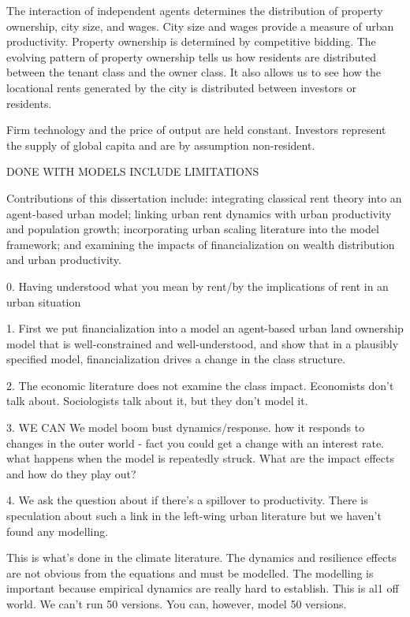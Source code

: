 The interaction of independent agents determines the distribution of property ownership,  city size, and wages. City size and wages provide a measure of urban productivity. Property ownership is determined by competitive bidding. The evolving pattern of property ownership tells us how residents are distributed between the tenant class and the owner class. It also allows us to see how the locational rents generated by the city is distributed between investors or residents.  %

Firm technology and the price of output are held constant. Investors represent the supply of global capita and are by assumption non-resident.   %




DONE WITH MODELS INCLUDE LIMITATIONS

Contributions of this dissertation include: integrating classical rent theory into an agent-based urban model; linking urban rent dynamics with urban productivity and population growth; incorporating urban scaling literature into the model framework; and examining the impacts of financialization on wealth distribution and urban productivity.



0. Having understood what you mean by rent/by the implications of rent in an urban situation

1. First we put financialization into a model an agent-based urban land ownership model that is well-constrained and well-understood, and show that in a plausibly specified model, financialization drives a change in the class structure. 

2. The economic literature does not examine the class impact. Economists don't talk about. Sociologists talk about it, but they don't model it.

3. WE CAN We model boom bust dynamics/response. how it responds to changes in the outer world - fact you could get a change with an interest rate. what happens when the model is repeatedly struck. What are the impact effects and how do they play out?

4.  We ask the question about if there's a spillover to productivity. There is speculation about such a link in the left-wing urban literature but we haven't found any modelling.

This is what's done in the climate literature. The dynamics and resilience effects are not obvious from the equations and must be modelled. The modelling is important because empirical dynamics are really hard to establish. This is al1 off world. We can't run 50 versions. You can, however, model 50 versions. 

